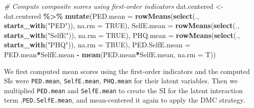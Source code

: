 \documentclass[
  man]{apa7}
\newenvironment{Shaded}{\begin{snugshade}}{\end{snugshade}}
\newcommand{\AttributeTok}[1]{\textcolor[rgb]{0.13,0.29,0.53}{#1}}
\newcommand{\CommentTok}[1]{\textcolor[rgb]{0.56,0.35,0.01}{\textit{#1}}}
\newcommand{\ConstantTok}[1]{\textcolor[rgb]{0.56,0.35,0.01}{#1}}
\newcommand{\FunctionTok}[1]{\textcolor[rgb]{0.13,0.29,0.53}{\textbf{#1}}}
\newcommand{\NormalTok}[1]{#1}
\newcommand{\OtherTok}[1]{\textcolor[rgb]{0.56,0.35,0.01}{#1}}
\newcommand{\SpecialCharTok}[1]{\textcolor[rgb]{0.81,0.36,0.00}{\textbf{#1}}}
\newcommand{\StringTok}[1]{\textcolor[rgb]{0.31,0.60,0.02}{#1}}
\begin{document}
\begin{Shaded}
\begin{Highlighting}[]
\CommentTok{\# Compute composite scores using first{-}order indicators}
\NormalTok{dat.centered }\OtherTok{\textless{}{-}}\NormalTok{ dat.centered }\SpecialCharTok{\%\textgreater{}\%}
  \FunctionTok{mutate}\NormalTok{(}\AttributeTok{PED.mean =} \FunctionTok{rowMeans}\NormalTok{(}\FunctionTok{select}\NormalTok{(., }\FunctionTok{starts\_with}\NormalTok{(}\StringTok{"PED"}\NormalTok{)), }\AttributeTok{na.rm =} \ConstantTok{TRUE}\NormalTok{),}
         \AttributeTok{SelfE.mean =} \FunctionTok{rowMeans}\NormalTok{(}\FunctionTok{select}\NormalTok{(., }\FunctionTok{starts\_with}\NormalTok{(}\StringTok{"SelfE"}\NormalTok{)), }\AttributeTok{na.rm =} \ConstantTok{TRUE}\NormalTok{),}
         \AttributeTok{PHQ.mean =} \FunctionTok{rowMeans}\NormalTok{(}\FunctionTok{select}\NormalTok{(., }\FunctionTok{starts\_with}\NormalTok{(}\StringTok{"PHQ"}\NormalTok{)), }\AttributeTok{na.rm =} \ConstantTok{TRUE}\NormalTok{),}
         \AttributeTok{PED.SelfE.mean =}\NormalTok{ PED.mean}\SpecialCharTok{*}\NormalTok{SelfE.mean }\SpecialCharTok{{-}} \FunctionTok{mean}\NormalTok{(PED.mean}\SpecialCharTok{*}\NormalTok{SelfE.mean, }\AttributeTok{na.rm =}\NormalTok{ T))}
\end{Highlighting}
\end{Shaded}

\normalsize
We first computed mean scores using the first-order indicators and the computed SIs were \texttt{PED.mean}, \texttt{SelfE.mean}, \texttt{PHQ.mean} for their latent variables. Then we multiplied \texttt{PED.mean} and \texttt{SelfE.mean} to create the SI for the latent interaction term ,\texttt{PED.SelfE.mean}, and mean-centered it again to apply the DMC strategy.

\footnotesize
\end{document}
